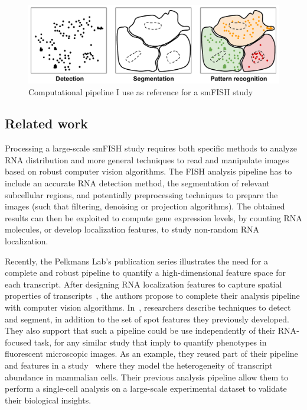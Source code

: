 \begin{figure}[]
    \centering
    \includegraphics[width=\textwidth]{figures/chapter1/schema_pipeline}
    \caption[Computational pipeline for a smFISH study]{Computational pipeline I use as reference for a smFISH study}
    \label{fig:pipeline}
\end{figure}

\subsection{Related work}
\label{subsec:related_work_fishquant}

Processing a large-scale \ac{smFISH} study requires both specific methods to analyze \ac{RNA} distribution and more general techniques to read and manipulate images based on robust computer vision algorithms.
The \ac{FISH} analysis pipeline has to include an accurate \ac{RNA} detection method, the segmentation of relevant subcellular regions, and potentially preprocessing techniques to prepare the images (such that filtering, denoising or projection algorithms).
The obtained results can then be exploited to compute gene expression levels, by counting \ac{RNA} molecules, or develop localization features, to study non-random \ac{RNA} localization.

Recently, the Pelkmans Lab's publication series illustrates the need for a complete and robust pipeline to quantify a high-dimensional feature space for each transcript.
After designing \ac{RNA} localization features to capture spatial properties of transcripts~\cite{battich_image-based_2013}, the authors propose to complete their analysis pipeline with computer vision algorithms.
In~\cite{stoeger_computer_2015}, researchers describe techniques to detect and segment, in addition to the set of spot features they previously developed.
They also support that such a pipeline could be use independently of their \ac{RNA}-focused task, for any similar study that imply to quantify phenotypes in fluorescent microscopic images.
As an example, they reused part of their pipeline and features in a study~\cite{battich_control_2015} where they model the heterogeneity of transcript abundance in mammalian cells.
Their previous analysis pipeline allow them to perform a single-cell analysis on a large-scale experimental dataset to validate their biological insights.

